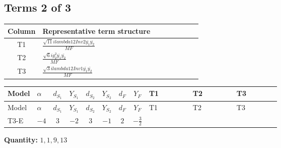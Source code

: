 \documentclass[8pt]{article}
\begin{document}
\begin{landscape}
\subsection*{Terms 2 of 3}
\begin{center}
\begin{tabular}{@{}c >{\raggedright\arraybackslash}p{0.82\linewidth}@{}}
\toprule
Column & Representative term structure \\
\midrule
T1 & \(\displaystyle \frac{\sqrt{11} i lambda12Inv2 \overline{y_{1}} \overline{y_{2}}}{MF}\) \\
\midrule
T2 & \(\displaystyle \frac{\sqrt{6} i g_{2}^{2} \overline{y_{1}} \overline{y_{2}}}{MF}\) \\
\midrule
T3 & \(\displaystyle \frac{\sqrt{3} i lambda12Inv1 \overline{y_{1}} \overline{y_{2}}}{MF}\) \\
\midrule
\bottomrule
\end{tabular}
\end{center}
\smallskip
\tiny
\begin{longtable}{@{}llcccccc >{\raggedright\arraybackslash}p{0.21\linewidth} >{\raggedright\arraybackslash}p{0.21\linewidth} >{\raggedright\arraybackslash}p{0.21\linewidth}@{}}
\toprule
Model & $\alpha$ & $d_{S_1}$ & $Y_{S_1}$ & $d_{S_2}$ & $Y_{S_2}$ & $d_F$ & $Y_F$ & T1 & T2 & T3 \\
\midrule
\endfirsthead
\toprule
Model & $\alpha$ & $d_{S_1}$ & $Y_{S_1}$ & $d_{S_2}$ & $Y_{S_2}$ & $d_F$ & $Y_F$ & T1 & T2 & T3 \\
\midrule
\endhead
T3-E & $-4$ & $3$ & $-2$ & $3$ & $-1$ & $2$ & $-\frac{3}{2}$ & \scriptsize\adjustbox{max width=\linewidth}{$\begin{gathered} - \frac{3 \sqrt{11} i lambda12Inv2 \overline{y_{1}} \overline{y_{2}}}{22 MF}\end{gathered}$} & \scriptsize\adjustbox{max width=\linewidth}{$\begin{gathered} - \frac{\sqrt{6} i g_{2}^{2} \overline{y_{1}} \overline{y_{2}}}{3 MF}\end{gathered}$} & \scriptsize\adjustbox{max width=\linewidth}{$\begin{gathered} \frac{\sqrt{3} i lambda12Inv1 \overline{y_{1}} \overline{y_{2}}}{6 MF}\end{gathered}$} \\
\midrule
\bottomrule
\end{longtable}
\clearpage
\noindent\textbf{Quantity: }$\mathrm{1,1,9,13}$\par\smallskip

\end{landscape}
\end{document}
